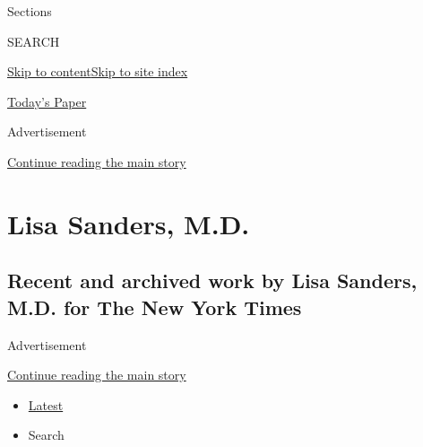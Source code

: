 Sections

SEARCH

\protect\hyperlink{site-content}{Skip to
content}\protect\hyperlink{site-index}{Skip to site index}

\href{https://myaccount.nytimes3xbfgragh.onion/auth/login?response_type=cookie\&client_id=vi}{}

\href{https://www.nytimes3xbfgragh.onion/section/todayspaper}{Today's
Paper}

Advertisement

\protect\hyperlink{after-top}{Continue reading the main story}

\hypertarget{lisa-sanders-md}{%
\section{Lisa Sanders, M.D.}\label{lisa-sanders-md}}

\hypertarget{recent-and-archived-work-by-lisa-sanders-md-for-the-new-york-times}{%
\subsection{Recent and archived work by Lisa Sanders, M.D. for The New
York
Times}\label{recent-and-archived-work-by-lisa-sanders-md-for-the-new-york-times}}

Advertisement

\protect\hyperlink{after-mid1}{Continue reading the main story}

\begin{itemize}
\tightlist
\item
  \protect\hyperlink{stream-panel}{Latest}
\item
  Search
\end{itemize}

